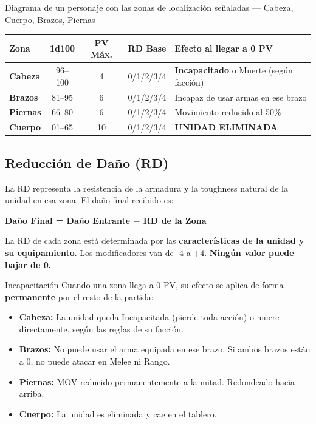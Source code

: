 \begin{imagebox}{Diagrama de un personaje con las zonas de localización señaladas — Cabeza, Cuerpo, Brazos, Piernas}
    \vspace{3.5cm}
\end{imagebox}

\begin{tabularx}{\linewidth}{|l|c|c|c|X|}
\hline
\rowcolor{HammerRed!20} \textbf{Zona} & \textbf{1d100} & \textbf{PV Máx.} & \textbf{RD Base} & \textbf{Efecto al llegar a 0 PV} \\ \hline
\textbf{Cabeza} & 96--100 & 4 & 0/1/2/3/4 & \textbf{Incapacitado} o Muerte (según facción) \\ \hline
\textbf{Brazos} & 81--95 & 6 & 0/1/2/3/4 & Incapaz de usar armas en ese brazo \\ \hline
\textbf{Piernas} & 66--80 & 6 & 0/1/2/3/4 & Movimiento reducido al 50\% \\ \hline
\textbf{Cuerpo} & 01--65 & 10 & 0/1/2/3/4 & \textbf{UNIDAD ELIMINADA} \\ \hline
\end{tabularx}

\vspace{0.3cm}

\subsection*{Reducción de Daño (RD)}

La RD representa la resistencia de la armadura y la toughness natural de la unidad en esa zona. El daño final recibido es:

\begin{tcolorbox}[colback=HammerRed!8, colframe=HammerRed]
\centering
\Large \textbf{Daño Final = Daño Entrante $-$ RD de la Zona}
\end{tcolorbox}

\vspace{0.2cm}

La RD de cada zona está determinada por las \textbf{características de la unidad y su equipamiento}. Los modificadores van de -4 a +4. \textbf{Ningún valor puede bajar de 0.}

\begin{reglaespecial}{Incapacitación}
Cuando una zona llega a 0 PV, su efecto se aplica de forma \textbf{permanente} por el resto de la partida:
\begin{itemize}
    \item \textbf{Cabeza:} La unidad queda Incapacitada (pierde toda acción) o muere directamente, según las reglas de su facción.
    \item \textbf{Brazos:} No puede usar el arma equipada en ese brazo. Si ambos brazos están a 0, no puede atacar en Melee ni Rango.
    \item \textbf{Piernas:} MOV reducido permanentemente a la mitad. Redondeado hacia arriba.
    \item \textbf{Cuerpo:} La unidad es eliminada y cae en el tablero.
\end{itemize}
\end{reglaespecial}


